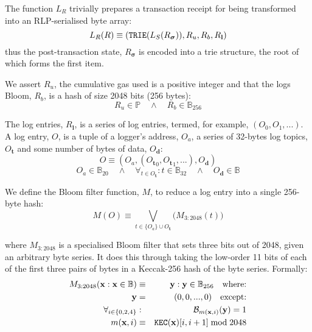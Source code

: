 \documentclass[9pt,oneside]{amsart}
\begin{document}
\begin{multicols}{2}
The function $L_R$ trivially prepares a transaction receipt for being transformed into an RLP-serialised byte array:
\begin{equation}
L_R(R) \equiv (\mathtt{\small TRIE}(L_S(R_{\boldsymbol{\sigma}})), R_u, R_b, R_\mathbf{l})
\end{equation}
thus the post-transaction state, $R_{\boldsymbol{\sigma}}$ is encoded into a trie structure, the root of which forms the first item.

We assert $R_u$, the cumulative gas used is a positive integer and that the logs Bloom, $R_b$, is a hash of size 2048 bits (256 bytes):
\begin{equation}
R_u \in \mathbb{P} \quad \wedge \quad R_b \in \mathbb{B}_{256}
\end{equation}


The log entries, $R_\mathbf{l}$, is a series of log entries, termed, for example, $(O_0, O_1, ...)$. A log entry, $O$, is a tuple of a logger's address, $O_a$, a series of 32-bytes log topics, $O_\mathbf{t}$ and some number of bytes of data, $O_\mathbf{d}$:
\begin{equation}
O \equiv (O_a, ({O_\mathbf{t}}_0, {O_\mathbf{t}}_1, ...), O_\mathbf{d})
\end{equation}
\begin{equation}
O_a \in \mathbb{B}_{20} \quad \wedge \quad \forall_{t \in O_\mathbf{t}}: t \in \mathbb{B}_{32} \quad \wedge \quad O_\mathbf{d} \in \mathbb{B}
\end{equation}

We define the Bloom filter function, $M$, to reduce a log entry into a single 256-byte hash:
\begin{equation}
M(O) \equiv \bigvee_{t \in \{O_a\} \cup O_\mathbf{t}} \big( M_{3:2048}(t) \big)
\end{equation}

where $M_{3:2048}$ is a specialised Bloom filter that sets three bits out of 2048, given an arbitrary byte series. It does this through taking the low-order 11 bits of each of the first three pairs of bytes in a Keccak-256 hash of the byte series. Formally:
\begin{eqnarray}
M_{3:2048}(\mathbf{x}: \mathbf{x} \in \mathbb{B}) & \equiv & \mathbf{y}: \mathbf{y} \in \mathbb{B}_{256} \quad \text{where:}\\
\mathbf{y} & = & (0, 0, ..., 0) \quad \text{except:}\\
\forall_{i \in \{0, 2, 4\}}&:& \mathcal{B}_{m(\mathbf{x}, i)}(\mathbf{y}) = 1\\
m(\mathbf{x}, i) &\equiv& \mathtt{\tiny KEC}(\mathbf{x})[i, i + 1] \bmod 2048
\end{eqnarray}


\end{multicols}
\end{document}
